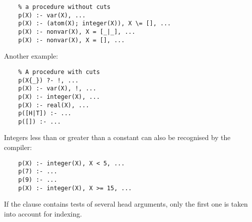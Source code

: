 \begin{verbatim}
    % a procedure without cuts
    p(X) :- var(X), ...
    p(X) :- (atom(X); integer(X)), X \= [], ...
    p(X) :- nonvar(X), X = [_|_], ...
    p(X) :- nonvar(X), X = [], ...
\end{verbatim}

Another example:
\begin{verbatim}
    % A procedure with cuts
    p(X{_}) ?- !, ...
    p(X) :- var(X), !, ...
    p(X) :- integer(X), ...
    p(X) :- real(X), ...
    p([H|T]) :- ...
    p([]) :- ...
\end{verbatim}

Integers less than or greater than a constant can also be
recognised by the compiler:
\begin{verbatim}
    p(X) :- integer(X), X < 5, ...
    p(7) :- ...
    p(9) :- ...
    p(X) :- integer(X), X >= 15, ...
\end{verbatim}

If the clause contains tests of several head arguments, only the
first one is taken into account for indexing.

